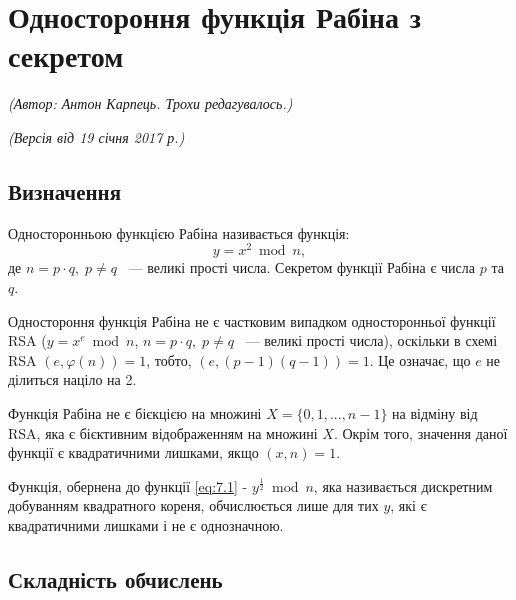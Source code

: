 \section{Одностороння функція Рабіна з секретом}
\begin{flushright}
\emph{(Автор: Антон Карпець. Трохи редагувалось.)}
\par \emph{(Версія від 19 січня 2017 р.)}
\end{flushright}

\subsection{Визначення}

\begin{mydef}
Односторонньою функцією Рабіна називається функція: 
\begin{equation} \label{eq:7.1}
y = x ^{2} \bmod n,
\end{equation}
де $n = p \cdot q,\; p \neq q$ ~--- великі прості числа. Секретом функції Рабіна є числа $p$ та $q$.
\end{mydef}

\begin{remark}
Одностороння функція Рабіна не є частковим випадком односторонньої функції RSA ($y = x ^{e} \bmod n$,
$n = p \cdot q,\; p \neq q$ ~--- великі прості числа), оскільки в схемі RSA $(e, \varphi(n)) = 1$, тобто, $(e, (p-1)(q-1)) = 1$. Це означає, що $e$ не ділиться націло на 2.
\end{remark}

\begin{remark}
Функція Рабіна не є бієкцією на множині $X = \{ 0, 1, ..., n-1 \}$ на відміну від RSA, яка є бієктивним відображенням на множині $X$. Окрім того, значення даної функції є квадратичними лишками, якщо $(x, n) = 1$.
\end{remark}

\begin{remark}
Функція, обернена до функції \eqref{eq:7.1} - $y ^{\frac{1}{2}} \bmod n$, яка називається дискретним добуванням квадратного кореня, обчислюється лише для тих $y$, які є квадратичними лишками і не є однозначною.
\end{remark}

\subsection{Складність обчислень}

